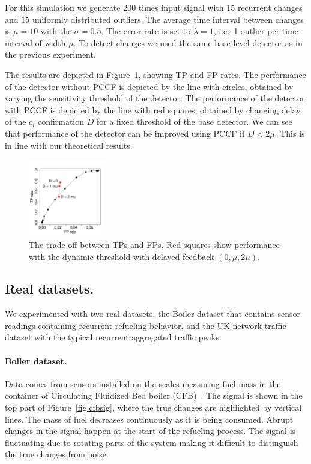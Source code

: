 For this simulation we generate $200$ times input signal with $15$ recurrent changes and $15$ uniformly distributed outliers.
The average time interval between changes is $\mu = 10$ with the $\sigma = 0.5$.
The error rate is set to $\lambda = 1$, i.e.\ 1 outlier per time interval of width $\mu$.
To detect changes we used the same base-level detector as in the previous experiment.

The results are depicted in Figure~\ref{fig:rocdynamic}, showing TP and FP rates.
The performance of the detector without PCCF is depicted by the line with circles, obtained by varying the sensitivity threshold of the detector.
The performance of the detector with PCCF is depicted by the line with red squares, obtained by changing delay of the $c_i$ confirmation $D$ for a fixed threshold of the base detector.
We can see that performance of the detector can be improved using PCCF if $D < 2 \mu$.
This is in line with our theoretical results.
\begin{figure}[htb!]
\centering
\includegraphics[width=0.30\textwidth]{articles/pics/sdm_paper/ROCImprovementAndDelay3}
\caption{
The trade-off between TPs and FPs.
Red squares show performance with the dynamic threshold with delayed feedback $(0, \mu, 2 \mu)$.}
\label{fig:rocdynamic}
\end{figure}

\subsection{Real datasets.} We experimented with two real datasets, the Boiler dataset that contains sensor readings containing recurrent refueling behavior, and the UK network traffic dataset with the typical recurrent aggregated traffic peaks.
\paragraph{Boiler dataset.}
Data comes from sensors installed on the scales measuring fuel mass in the container of Circulating Fluidized Bed boiler (CFB)~\cite{PechenizkiySIGKDDExpl09}.
The signal is shown in the top part of Figure~\ref{fig:cfbsig}, where the true changes are highlighted by vertical lines.
The mass of fuel decreases continuously as it is being consumed.
Abrupt changes in the signal happen at the start of the refueling process.
The signal is fluctuating due to rotating parts of the system making it difficult to distinguish the true changes from noise.

